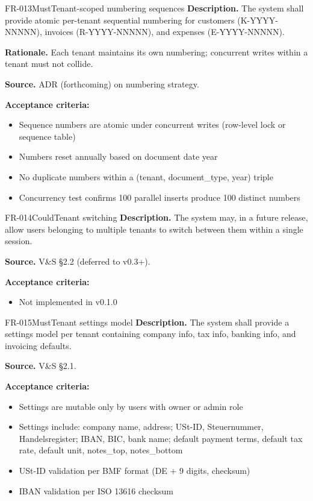 \documentclass[11pt,a4paper]{article}
\begin{document}
\begin{requirement}{FR-013}{Must}{Tenant-scoped numbering sequences}
\textbf{Description.} The system shall provide atomic per-tenant sequential numbering for customers (K-YYYY-NNNNN), invoices (R-YYYY-NNNNN), and expenses (E-YYYY-NNNNN).

\textbf{Rationale.} Each tenant maintains its own numbering; concurrent writes within a tenant must not collide.

\textbf{Source.} ADR (forthcoming) on numbering strategy.

\textbf{Acceptance criteria:}
\begin{itemize}
    \item Sequence numbers are atomic under concurrent writes (row-level lock or sequence table)
    \item Numbers reset annually based on document date year
    \item No duplicate numbers within a (tenant, document\_type, year) triple
    \item Concurrency test confirms 100 parallel inserts produce 100 distinct numbers
\end{itemize}
\end{requirement}

\begin{requirement}{FR-014}{Could}{Tenant switching}
\textbf{Description.} The system may, in a future release, allow users belonging to multiple tenants to switch between them within a single session.

\textbf{Source.} V\&S \S2.2 (deferred to v0.3+).

\textbf{Acceptance criteria:}
\begin{itemize}
    \item Not implemented in v0.1.0
\end{itemize}
\end{requirement}

\begin{requirement}{FR-015}{Must}{Tenant settings model}
\textbf{Description.} The system shall provide a settings model per tenant containing company info, tax info, banking info, and invoicing defaults.

\textbf{Source.} V\&S \S2.1.

\textbf{Acceptance criteria:}
\begin{itemize}
    \item Settings are mutable only by users with owner or admin role
    \item Settings include: company name, address; USt-ID, Steuernummer, Handelsregister; IBAN, BIC, bank name; default payment terms, default tax rate, default unit, notes\_top, notes\_bottom
    \item USt-ID validation per BMF format (DE + 9 digits, checksum)
    \item IBAN validation per ISO 13616 checksum
\end{itemize}
\end{requirement}
\end{document}
